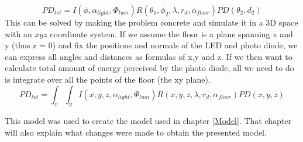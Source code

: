 \begin{equation}
	\label{eq:fullmodel}
	PD_{tot} = I(\phi,\alpha_{light},\Phi_{lum}) R(\theta_1,\phi_2,\lambda,r_d,\alpha_{floor}) PD(\theta_2,d_2)
\end{equation}
This can be solved by making the problem concrete and simulate it in a 3D space with an $xyz$ coordinate system. If we assume the floor is a plane spanning x and y (thus z = 0) and fix the positions and normals of the LED and photo diode, we can express all angles and distances as formulas of x,y and z. If we then want to calculate total amount of energy perceived by the photo diode, all we need to do is integrate over all the points of the floor (the xy plane).
\begin{equation}
\label{eq:fullmodel_xy}
PD_{tot} = \int_x \int_y I(x,y,z,\alpha_{light},\Phi_{lum}) R(x,y,z,\lambda,r_d,\alpha_{floor}) PD(x,y,z)
\end{equation}

This model was used to create the model used in chapter \ref{Model}. That chapter will also explain what changes were made to obtain the presented model.